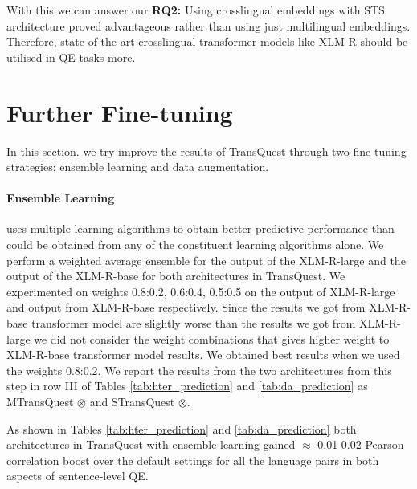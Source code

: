 With this we can answer our \textbf{RQ2:} Using crosslingual embeddings with STS architecture proved advantageous rather than using just multilingual embeddings. Therefore, state-of-the-art crosslingual transformer models like XLM-R should be utilised in QE tasks more. 


\section{Further Fine-tuning}
\label{sec:transquest_finetune}
In this section. we try improve the results of TransQuest through two fine-tuning strategies; ensemble learning and data augmentation. 

\paragraph{Ensemble Learning} uses multiple learning algorithms to obtain better predictive performance than could be obtained from any of the constituent learning algorithms alone. We perform a weighted average ensemble for the output of the XLM-R-large and the output of the XLM-R-base for both architectures in TransQuest. We experimented on weights 0.8:0.2, 0.6:0.4, 0.5:0.5 on the output of XLM-R-large and output from XLM-R-base respectively. Since the results we got from XLM-R-base transformer model are slightly worse than the results we got from XLM-R-large we did not consider the weight combinations that gives higher weight to XLM-R-base transformer model results. We obtained best results when we used the weights 0.8:0.2. We report the results from the two architectures from this step in row III of Tables \ref{tab:hter_prediction} and \ref{tab:da_prediction} as MTransQuest $\otimes$ and STransQuest $\otimes$.

As shown in Tables \ref{tab:hter_prediction} and \ref{tab:da_prediction} both architectures in TransQuest with ensemble learning gained $\approx$ 0.01-0.02 Pearson correlation boost over the default settings for all the language pairs in both aspects of sentence-level QE.  

